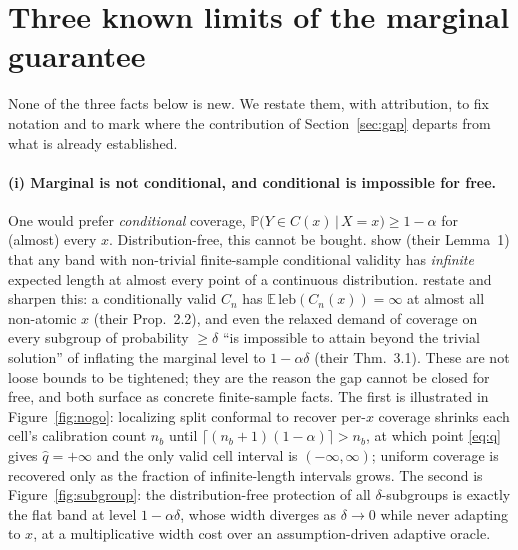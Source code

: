\documentclass[11pt]{article}
\theoremstyle{definition}
\newcommand{\E}{\mathbb{E}}
\renewcommand{\Pr}{\mathbb{P}}
\newcommand{\given}{\,\vert\,}
\begin{document}
\section{Three known limits of the marginal guarantee}\label{sec:marginal}

None of the three facts below is new. We restate them, with attribution, to fix notation
and to mark where the contribution of Section~\ref{sec:gap} departs from what is already
established.

\paragraph{(i) Marginal is not conditional, and conditional is impossible for free.}
One would prefer \emph{conditional} coverage,
$\Pr\big(Y\in C(x)\given X=x\big)\ge 1-\alpha$ for (almost) every $x$. Distribution-free,
this cannot be bought. \citet{lei2014distribution} show (their Lemma~1) that any band
with non-trivial finite-sample conditional validity has \emph{infinite} expected length
at almost every point of a continuous distribution.
\citet{barber2021limits} restate and sharpen this: a conditionally valid $C_n$ has
$\E\,\mathrm{leb}(C_n(x))=\infty$ at almost all non-atomic $x$ (their Prop.~2.2), and
even the relaxed demand of coverage on every subgroup of probability $\ge\delta$ ``is
impossible to attain beyond the trivial solution'' of inflating the marginal level to
$1-\alpha\delta$ (their Thm.~3.1). These are not loose bounds to be tightened; they are the
reason the gap cannot be closed for free, and both surface as concrete finite-sample facts.
The first is illustrated in Figure~\ref{fig:nogo}: localizing split conformal to recover
per-$x$ coverage shrinks each cell's calibration count $n_b$ until
$\lceil (n_b+1)(1-\alpha)\rceil > n_b$, at which point \eqref{eq:q} gives $\hat q=+\infty$
and the only valid cell interval is $(-\infty,\infty)$; uniform coverage is recovered only
as the fraction of infinite-length intervals grows. The second is Figure~\ref{fig:subgroup}:
the distribution-free protection of all $\delta$-subgroups is exactly the flat band at level
$1-\alpha\delta$, whose width diverges as $\delta\to 0$ while never adapting to $x$, at a
multiplicative width cost over an assumption-driven adaptive oracle.
\end{document}
